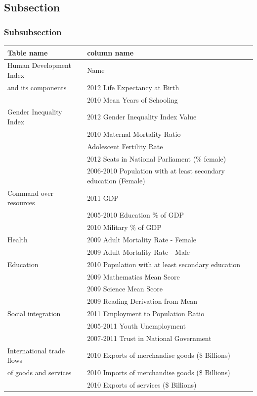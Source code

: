 \documentclass[a4paper,11pt]{article}
\begin{document}
\subsection{Subsection}
\subsubsection{Subsubsection}

\begin{table}
	\begin{tabular}{|l|l|}
		\hline
		Table name & column name\\ 
		\hline
		Human Development Index & Name \\
		and its components & 2012 Life Expectancy at Birth\\
		& 2010 Mean Years of Schooling\\
		\hline
		Gender Inequality Index & 2012 Gender Inequality Index Value\\
		& 2010 Maternal Mortality Ratio\\
		& Adolescent Fertility Rate\\
		& 2012 Seats in National Parliament (\% female)\\
		& 2006-2010 Population with at least secondary education (Female)\\
		\hline
		Command over resources & 2011 GDP\\
		& 2005-2010 Education \% of GDP\\
		& 2010 Military \% of GDP\\
		\hline
		Health & 2009 Adult Mortality Rate - Female\\
		& 2009 Adult Mortality Rate - Male\\ 
		\hline
		Education & 2010 Population with at least secondary education\\
		& 2009 Mathematics Mean Score\\
		& 2009 Science Mean Score\\ 
		& 2009 Reading Derivation from Mean\\
		\hline
		Social integration & 2011 Employment to Population Ratio\\
		& 2005-2011 Youth Unemployment\\
		& 2007-2011 Trust in National Government\\
		\hline
		International trade flows & 2010 Exports of merchandise goods (\$ Billions)\\
		of goods and services & 2010 Imports of merchandise goods (\$ Billions)\\
		& 2010 Exports of services (\$ Billions)\\

\end{tabular}
\end{table}
\end{document}
